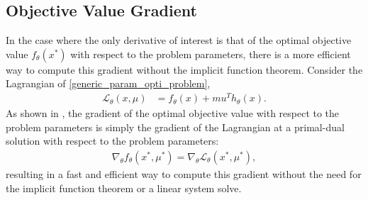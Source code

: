 \subsection{Objective Value Gradient}
%
In the case where the only derivative of interest is that of the optimal objective value $f_\theta(x^*)$ with respect to the problem parameters, there is a more efficient way to compute this gradient without the implicit function theorem. Consider the Lagrangian of \eqref{generic_param_opti_problem},
\begin{align}
    \mathcal{L}_\theta (x, \mu) &= f_\theta(x) + mu^Th_\theta(x). 
\end{align}
As shown in \cite{castillo2006}, the gradient of the optimal objective value with respect to the problem parameters is simply the gradient of the Lagrangian at a primal-dual solution with respect to the problem parameters:
\begin{align}
    \nabla_\theta f_\theta(x^*, \mu^*)= \nabla_\theta \mathcal{L}_\theta(x^*, \mu^*), \label{eq:lag_grad}
\end{align}
resulting in a fast and efficient way to compute this gradient without the need for the implicit function theorem or a linear system solve. 

